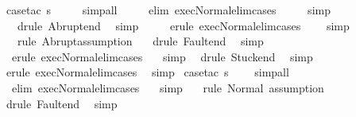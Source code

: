 \begin{isabellebody}
\isamarkupfalse%
\ \ {\isacharparenleft}case{\isacharunderscore}tac\ s{\isacharprime}{\isacharparenright}\isanewline
{}\isamarkupfalse%
\ \ \ \ \ simp{\isacharunderscore}all\isanewline
{}\isamarkupfalse%
\ \ \ \ \ {\isacharparenleft}elim\ exec{\isacharunderscore}Normal{\isacharunderscore}elim{\isacharunderscore}cases{\isacharparenright}\isanewline
{}\isamarkupfalse%
\ \ \ \ \ simp\isanewline
{}\isamarkupfalse%
\ \ \ \ {\isacharparenleft}drule\ Abrupt{\isacharunderscore}end{\isacharparenright}\ \isamarkupfalse%
\ simp\ \isanewline
{}\isamarkupfalse%
\ \ \ \ {\isacharparenleft}erule\ exec{\isacharunderscore}Normal{\isacharunderscore}elim{\isacharunderscore}cases{\isacharparenright}\isanewline
{}\isamarkupfalse%
\ \ \ \ simp\ \ \isanewline
{}\isamarkupfalse%
\ \ \ \ {\isacharparenleft}rule\ Abrupt{\isacharcomma}assumption{\isacharplus}{\isacharparenright}\isanewline
{}\isamarkupfalse%
\ \ \ {\isacharparenleft}drule\ Fault{\isacharunderscore}end{\isacharparenright}\ \isamarkupfalse%
\ simp\isanewline
{}\isamarkupfalse%
\ \ \ {\isacharparenleft}erule\ exec{\isacharunderscore}Normal{\isacharunderscore}elim{\isacharunderscore}cases{\isacharparenright}\isanewline
{}\isamarkupfalse%
\ \ \ simp\isanewline
{}\isamarkupfalse%
\ \ {\isacharparenleft}drule\ Stuck{\isacharunderscore}end{\isacharparenright}\ \isamarkupfalse%
\ simp\isanewline
{}\isamarkupfalse%
\ \ {\isacharparenleft}erule\ exec{\isacharunderscore}Normal{\isacharunderscore}elim{\isacharunderscore}cases{\isacharparenright}\isanewline
{}\isamarkupfalse%
\ \ simp\isanewline
{}\isamarkupfalse%
\ {\isacharparenleft}case{\isacharunderscore}tac\ s{\isacharprime}{\isacharparenright}\isanewline
{}\isamarkupfalse%
\ \ \ \ simp{\isacharunderscore}all\isanewline
{}\isamarkupfalse%
\ \ \ {\isacharparenleft}elim\ exec{\isacharunderscore}Normal{\isacharunderscore}elim{\isacharunderscore}cases{\isacharparenright}\isanewline
{}\isamarkupfalse%
\ \ \ simp\isanewline
{}\isamarkupfalse%
\ \ \ {\isacharparenleft}rule\ Normal{\isacharcomma}\ assumption{\isacharplus}{\isacharparenright}\isanewline
{}\isamarkupfalse%
\ \ {\isacharparenleft}drule\ Fault{\isacharunderscore}end{\isacharparenright}\ \isamarkupfalse%
\ simp\isanewline
{}\isamarkupfalse%

\end{isabellebody}
